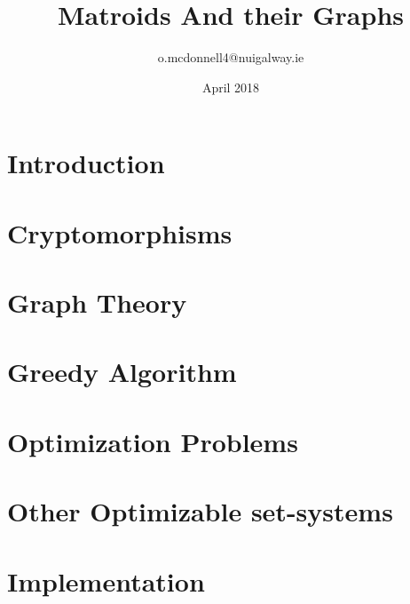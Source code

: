\documentclass{article}
\title{Matroids And their Graphs}
\author{o.mcdonnell4@nuigalway.ie }
\date{April 2018}
\theoremstyle{plain}
\theoremstyle{definition}
\theoremstyle{remark}
\begin{document}
 

\tableofcontents
\pagebreak


\section{Introduction}

\pagebreak




\pagebreak

\section{Cryptomorphisms}



\pagebreak



\pagebreak

\section{Graph Theory}


\pagebreak

\section{Greedy Algorithm}


\pagebreak

\section{Optimization Problems}





\pagebreak

\section{Other Optimizable set-systems}




\section{Implementation}




\pagebreak
\end{document}

